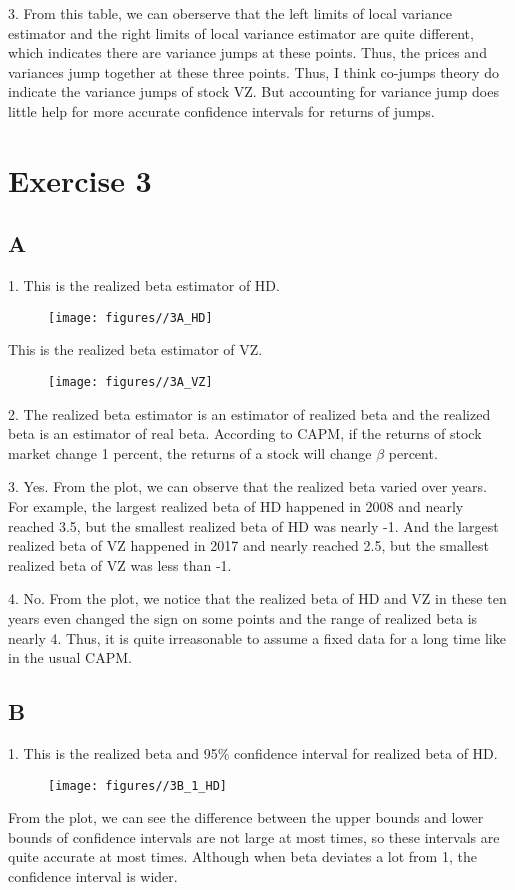 \documentclass{report}
\begin{document}
3. From this table, we can oberserve that the left limits of local variance estimator and the right limits of local variance estimator are quite different, which indicates there are variance jumps at these points. Thus, the prices and variances jump together at these three points. Thus, I think co-jumps theory do indicate the variance jumps of stock VZ. But accounting for variance jump does little help for more accurate confidence intervals for returns of jumps. 


\section{ Exercise 3}

\subsection{A}
1. This is the realized beta estimator of HD.
\begin{figure}[H]
        \centering 
         \texttt{[image: figures//3A\_HD]}
\end{figure}

This is the realized beta estimator of VZ.
\begin{figure}[H]
        \centering 
         \texttt{[image: figures//3A\_VZ]}
\end{figure}

2. The realized beta estimator is an estimator of realized beta and the realized beta is an estimator of real beta.  According to CAPM, if the returns of stock market change 1 percent, the returns of a stock will change $\beta$ percent.

3. Yes. From the plot, we can observe that the realized beta varied over years. For example, the largest realized beta of HD happened in 2008 and nearly reached 3.5, but the smallest realized beta of HD was nearly -1.  And the largest realized beta of VZ happened in 2017 and nearly reached 2.5, but the smallest realized beta of VZ was less than -1.

4. No. From the plot, we notice that the realized beta of HD and VZ in these ten years even changed the sign on some points and the range of realized beta is nearly 4. Thus, it is quite irreasonable to assume a fixed data for a long time like in the usual CAPM.

\subsection{B}
1. This is the realized beta and 95\% confidence interval for realized beta of HD.
\begin{figure}[H]
        \centering 
         \texttt{[image: figures//3B\_1\_HD]}
\end{figure}
From the plot, we can see the difference between the upper bounds and lower bounds of confidence intervals are not large at most times, so these intervals are quite accurate at most times. Although when beta deviates a lot from 1, the confidence interval is wider.
\end{document}
